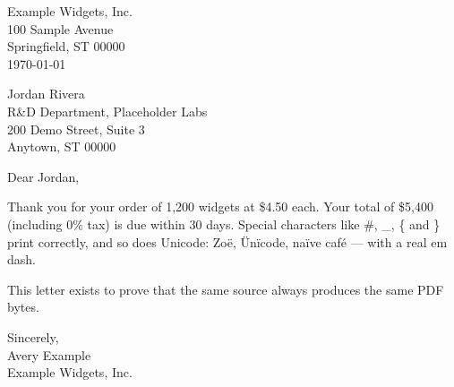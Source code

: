 \documentclass[11pt]{article}
\begin{document}
\begin{flushright}
Example Widgets, Inc.\\
100 Sample Avenue\\
Springfield, ST 00000\\[1em]
\today
\end{flushright}

Jordan Rivera\\
R\&D Department, Placeholder Labs\\
200 Demo Street, Suite 3\\
Anytown, ST 00000

Dear Jordan,

Thank you for your order of 1,200 widgets at \$4.50 each. Your total of
\$5,400 (including 0\% tax) is due within 30 days. Special characters
like \#, \_, \{ and \} print correctly, and so does Unicode: Zoë, Ünïcode,
naïve café — with a real em dash.

This letter exists to prove that the same source always produces the same
PDF bytes.

Sincerely,\\[3em]
Avery Example\\
Example Widgets, Inc.
\end{document}
